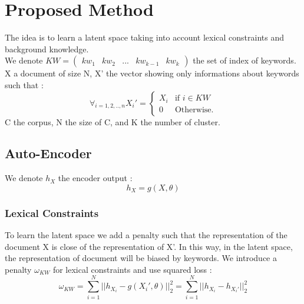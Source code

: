 \section{Proposed Method}
The idea is to learn a latent space taking into account lexical constraints and
background knowledge.
\\We denote $KW = \begin{pmatrix} kw_1 & kw_2 & ... & kw_{k-1} & kw_{k}
\end {pmatrix}$
the set of index of keywords. X a document of size N,
X' the vector showing only informations about keywords such that :
\begin{equation*}
\forall_{i=1,2,..,n}X_i' = \left\{
\begin{array}{ll}
  X_i & \mbox{if } i \in KW \\
  0 & \mbox{Otherwise.}
\end{array}
\right.
\end{equation*}
C the corpus, N the size of C, and K the number of cluster.
\subsection{Auto-Encoder}
We denote $h_X$ the encoder output : 
\begin{equation}\label{eq:h}
  h_X = g(X,\theta)
\end{equation}
\subsubsection{Lexical Constraints}
To learn the latent space we add a penalty such that the representation
of the document X is close of the representation of X'. In this way, in the
latent space, the representation of document will be biased by keywords.
We introduce a penalty $\omega_{KW}$ for lexical constraints and
use squared loss : 
\begin{equation}\label{eq:omega1}
  \omega_{KW} = \sum_{i=1}^N || h_{X_i} - g(X_i',\theta) ||_2^2 =
  \sum_{i=1}^N || h_{X_i} - h_{X_i'}||_2^2
\end{equation}

